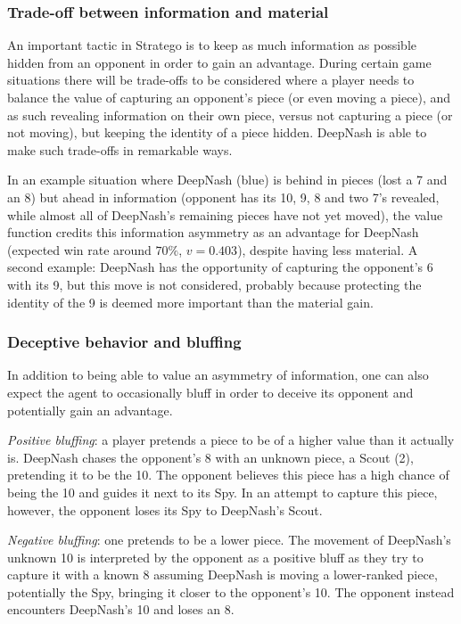 \subsubsection{Trade-off between information and material}
An important tactic in Stratego is to keep as much information as possible hidden from an opponent in order to gain an advantage. During certain game situations there will be trade-offs to be considered where a player needs to balance the value of capturing an opponent's piece (or even moving a piece), and as such revealing information on their own piece, versus not capturing a piece (or not moving), but keeping the identity of a piece hidden. DeepNash is able to make such trade-offs in remarkable ways.

In an example situation where DeepNash (blue) is behind in pieces (lost a 7 and an 8) but ahead in information (opponent has its 10, 9, 8 and two 7's revealed, while almost all of DeepNash's remaining pieces have not yet moved), the value function credits this information asymmetry as an advantage for DeepNash (expected win rate around $70\%$, $v=0.403$), despite having less material. A second example: DeepNash has the opportunity of capturing the opponent's 6 with its 9, but this move is not considered, probably because protecting the identity of the 9 is deemed more important than the material gain.

\subsubsection{Deceptive behavior and bluffing}
In addition to being able to value an asymmetry of information, one can also expect the agent to occasionally bluff in order to deceive its opponent and potentially gain an advantage.

\emph{Positive bluffing}: a player pretends a piece to be of a higher value than it actually is. DeepNash chases the opponent's 8 with an unknown piece, a Scout (2), pretending it to be the 10. The opponent believes this piece has a high chance of being the 10 and guides it next to its Spy. In an attempt to capture this piece, however, the opponent loses its Spy to DeepNash's Scout.

\emph{Negative bluffing}: one pretends to be a lower piece. The movement of DeepNash's unknown 10 is interpreted by the opponent as a positive bluff as they try to capture it with a known 8 assuming DeepNash is moving a lower-ranked piece, potentially the Spy, bringing it closer to the opponent's 10. The opponent instead encounters DeepNash's 10 and loses an 8.

